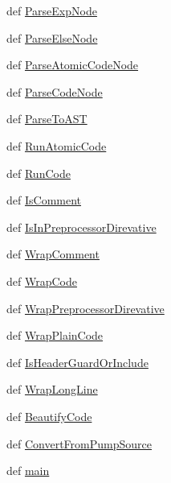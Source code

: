 \begin{DoxyCompactItemize}
def \hyperlink{namespacepump_a150cd6bba14352433acc753d4591670e}{\-Parse\-Exp\-Node}
\item 
def \hyperlink{namespacepump_a7c097cb9e4096fd75d1fed9d26b87bfd}{\-Parse\-Else\-Node}
\item 
def \hyperlink{namespacepump_a40224eb47d27ea5626c29081d0d533f2}{\-Parse\-Atomic\-Code\-Node}
\item 
def \hyperlink{namespacepump_aa889d697c651115f8eb880d5b9dd7120}{\-Parse\-Code\-Node}
\item 
def \hyperlink{namespacepump_a2bb33f428498bc39017e60acc4a28593}{\-Parse\-To\-A\-S\-T}
\item 
def \hyperlink{namespacepump_af8495f590c6140bb8fe23807f7d0f09e}{\-Run\-Atomic\-Code}
\item 
def \hyperlink{namespacepump_ac1cc678dd90b4e98e9e6757c2d8ed99a}{\-Run\-Code}
\item 
def \hyperlink{namespacepump_ad622ff337885deef7970ed22908fb182}{\-Is\-Comment}
\item 
def \hyperlink{namespacepump_a101c9171c77f8491faf600af4b48e516}{\-Is\-In\-Preprocessor\-Direvative}
\item 
def \hyperlink{namespacepump_a8677a2e43df12f97c0264c11484c93ad}{\-Wrap\-Comment}
\item 
def \hyperlink{namespacepump_a47b13e91e95ce5ad82778b919b51dc0b}{\-Wrap\-Code}
\item 
def \hyperlink{namespacepump_ab79a373a6832251df2a3a0de88c2bb67}{\-Wrap\-Preprocessor\-Direvative}
\item 
def \hyperlink{namespacepump_aa10f49653a1076dd726c717e6498e38c}{\-Wrap\-Plain\-Code}
\item 
def \hyperlink{namespacepump_a2dbcc069f95fcebc2fe98e237075d8af}{\-Is\-Header\-Guard\-Or\-Include}
\item 
def \hyperlink{namespacepump_addffcaf4dbb430aaeb7193cca96c0422}{\-Wrap\-Long\-Line}
\item 
def \hyperlink{namespacepump_a57fae516f7cf25ad72a7074e2b0c9d3c}{\-Beautify\-Code}
\item 
def \hyperlink{namespacepump_ae4a7ae18fdc10f1460aace6726295f36}{\-Convert\-From\-Pump\-Source}
\item 
def \hyperlink{namespacepump_a7b440d502623497b7d8cfcbb03a7f8c5}{main}
\end{DoxyCompactItemize}
